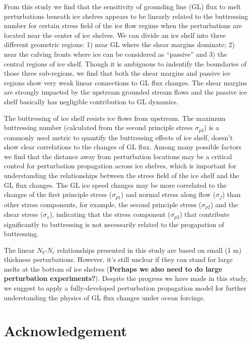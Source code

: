 \documentclass[review,oneside]{igs}
\begin{document}
From this study we find that the sensitivity of grounding line (GL) flux to melt perturbations beneath ice shelves appears to be linearly related to the buttressing number for certain stress field of the ice flow regime when the perturbations are located near the center of ice shelves. We can divide an ice shelf into three different geometric regions: 1) near GL where the shear margins dominate; 2) near the calving fronts where ice can be considered as ``passive'' and 3) the central regions of ice shelf. Though it is ambiguous to indentify the boundaries of those three sub-regions, we find that both the shear margins and passive ice regions show very weak linear connections to GL flux changes. The shear margins are strongly impacted by the upstream grounded stream flows and the passive ice shelf basically has negligible contribution to GL dynamics. 

The buttressing of ice shelf resists ice flows from upstream. The maximum buttressing number (calculated from the second principle stress $\sigma_{p2}$) is a commonly used metric to quantify the buttressing effects of ice shelf, doesn't show clear correlations to the changes of GL flux. Among many possible factors we find that the distance away from perturbation locations may be a critical control for perturbation propagation across ice shelves, which is important for understanding the relationships between the stress field of the ice shelf and the GL flux changes. The GL ice speed changes may be more correlated to the changes of the first principle stress ($\sigma_{p1}$) and normal stress along flow ($\sigma_{f}$) than other stress components, for example, the second principle stress ($\sigma_{p2}$) and the shear stress ($\sigma_s$), indicating that the stress component ($\sigma_{p2}$) that contribute significantly to buttressing is not necessarily related to the progapation of buttressing. 

The linear $N_b$-$N_r$ relationships presented in this study are based on small (1 m) thickness perturbations. However, it's still unclear if they can stand for large melts at the bottom of ice shelves ({\bf{Perhaps we also need to do large perturbation experiments?}}). Despite the progress we have made in this study, we suggest to apply a fully-developed perturbation propagation model for further understanding the physics of GL flux changes under ocean forcings. 

\section{Acknowledgement}


\end{document}
